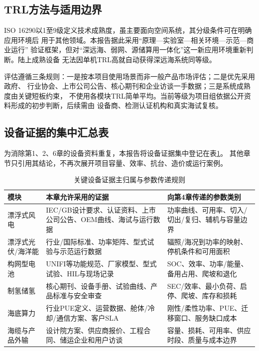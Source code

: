 \subsection{TRL方法与适用边界}

ISO 16290以1至9级定义技术成熟度，虽主要面向空间系统，其分级条件可在明确应用环境后
用于其他领域\cite{iso16290}。本报告据此采用“原理—实验室—相关环境—示范—商业运行”
验证框架，但对“深远海、弱网、源储算用一体化”这一新应用环境重新判断。陆上成熟设备
无法因单机TRL高就自动获得深远海系统同等级。

评估遵循三条规则：一是按本项目使用场景而非一般产品市场评估；二是优先采用政府、
行业协会、上市公司公告、核心期刊和企业访谈一手数据；三是系统成熟度由关键短板约束，
不使用各模块TRL简单平均。当前等级为项目组依据公开资料形成的初步判断，后续需由
设备商、检测认证机构和真实海试复核。

\subsection{设备证据的集中汇总表}

为消除第1、2、6章的设备资料重复，本报告将设备证据集中登记在表\ref{tab:c3-evidence-home}。
其他章节只引用其结论，不再次展开项目容量、效率、抗台、造价或运行案例。

\begin{table}[H]
\centering
\caption{关键设备证据主归属与参数传递规则}
\label{tab:c3-evidence-home}
\small
\begin{tabularx}{\textwidth}{p{2.5cm} >{\raggedright\arraybackslash}X >{\raggedright\arraybackslash}X}
\toprule
模块 & 本章允许采用的证据 & 向第4章传递的参数类别\\
\midrule
漂浮式风电 & IEC/GB设计要求、认证资料、上市公司公告、OEM曲线、海试与运行数据 & 功率曲线、可用率、切入/切出/复归、辅机与容量边界\\
漂浮式光伏/海洋能 & 行业/国际标准、功率矩阵、型式试验与示范运行数据 & 辐照/海况到功率的映射、停机条件和可用面积\\
构网型电池 & UNIFI等功能规范、厂家模型、型式试验、HIL与现场记录 & SOC、效率、功率/能量、备用占用、爬坡和退化\\
制氢储氢 & 核心期刊、设备手册、试验曲线、产品标准与安全审查 & SEC/效率、最小负荷、启停、爬坡、库存和损耗\\
海底算力 & 行业PUE定义、运营数据、舱体/冷却/通信方案、客户SLA & 刚性/柔性功率、PUE、迁移窗口、服务缺口成本\\
海缆与产品外输 & 设计院方案、供应商报价、工程合同、储运企业和用户访谈 & 容量、损耗、可用率、供应时段、质量与成本边界\\
\bottomrule
\end{tabularx}

\end{table}


